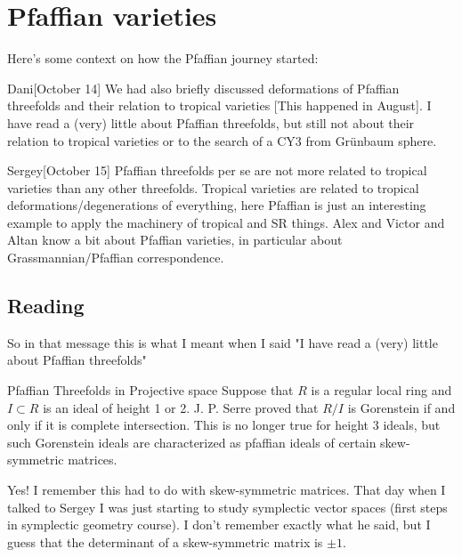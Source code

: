 \clearpage
\section{Pfaffian varieties}

{\color{2}Here's some context on how the Pfaffian journey started:}

\begin{thing4}{Dani}[October 14]\leavevmode
	We had also briefly discussed deformations of Pfaffian threefolds and their relation to tropical varieties {\color{3}[This happened in August]}. I have read a (very) little about Pfaffian threefolds, but still not about their relation to tropical varieties or to the search of a CY3 from Grünbaum sphere.
\end{thing4}

\begin{thing14}{Sergey}[October 15]\leavevmode
	Pfaffian threefolds per se are not more related to tropical varieties than any other threefolds. Tropical varieties are related to tropical deformations/degenerations of everything, here Pfaffian is just an interesting example to apply the machinery of tropical and SR things. Alex and Victor and Altan know a bit about Pfaffian varieties, in particular about Grassmannian/Pfaffian correspondence.
\end{thing14}

\subsection{Reading \cite{pfaffian}}

{\color{2}So in that message this is what I meant when I said "I have read a (very) little about Pfaffian threefolds"}

\begin{thing4}{Pfaffian Threefolds in Projective space}\leavevmode
	Suppose that $R$ is a regular local ring and $I\subset R$ is an ideal of height 1 or 2. J. P. Serre proved that $R/I$ is Gorenstein if and only if it is complete intersection. This is no longer true for height 3 ideals, but such Gorenstein ideals are characterized as pfaffian ideals of certain skew-symmetric matrices.
\end{thing4}

{\color{persimmon}Yes! I remember this had to do with skew-symmetric matrices. That day when I talked to Sergey I was just starting to study symplectic vector spaces (first steps in symplectic geometry course). I don't remember exactly what he said, but I guess that the determinant of a skew-symmetric matrix is $\pm 1$.}

